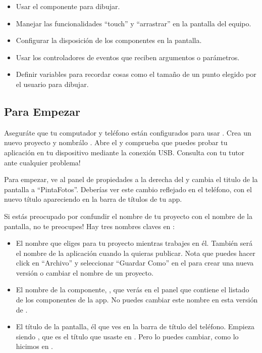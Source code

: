 \begin{itemize}
\item Usar el componente  para dibujar.
\item Manejar las funcionalidades “touch” y “arrastrar” en la pantalla del equipo.
\item Configurar la disposición de los componentes en la pantalla.
\item Usar los controladores de eventos que reciben argumentos o
  parámetros.
\item Definir variables para recordar cosas como el tamaño de un punto
  elegido por el usuario para dibujar.
\end{itemize}

\subsection*{Para Empezar}

Aseguráte que tu computador y teléfono están configurados para usar
\AppInventor. Crea un nuevo proyecto y nombrálo . Abre el
\blockEditor y comprueba que puedes probar tu aplicación en tu
dispositivo mediante la conexión USB. Consulta con tu tutor ante
cualquier problema!

Para empezar, ve al panel de propiedades a la derecha del \designer y
cambia el titulo de la pantalla a ``PintaFotos''. Deberías ver este
cambio reflejado en el teléfono, con el nuevo título apareciendo en la
barra de títulos de tu app.

Si estás preocupado por confundir el nombre de tu proyecto con el
nombre de la pantalla, no te preocupes! Hay tres nombres claves en
\AppInventor:

\begin{itemize}	

\item El nombre que eliges para tu proyecto mientras trabajes en
  él. También será el nombre de la aplicación cuando la quieras
  publicar. Nota que puedes hacer click en “Archivo” y seleccionar
  ``Guardar Como'' en el \designer para crear una nueva versión o
  cambiar el nombre de un proyecto.

\item El nombre de la componente, , que verás en el
  panel que contiene el listado de los componentes de la app. No
  puedes cambiar este nombre en esta versión de \AppInventor.

\item El título de la pantalla, él que ves en la barra de título del
  teléfono. Empieza siendo , que es el título que
  usaste en . Pero lo puedes cambiar, como lo
  hicimos en .
\end{itemize}


